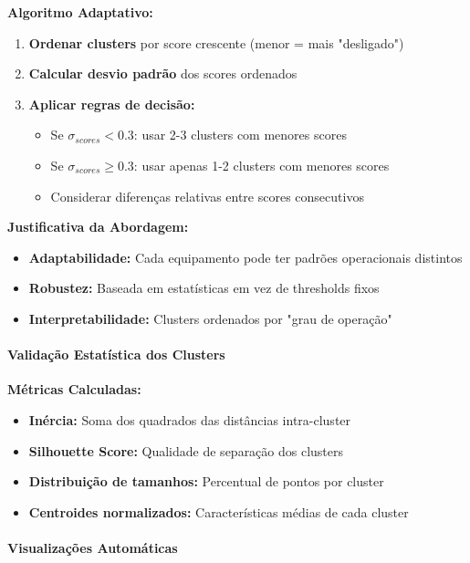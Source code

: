 \textbf{Algoritmo Adaptativo:}

\begin{enumerate}
    \item \textbf{Ordenar clusters} por score crescente (menor = mais "desligado")
    \item \textbf{Calcular desvio padrão} dos scores ordenados
    \item \textbf{Aplicar regras de decisão:}
    \begin{itemize}
        \item Se $\sigma_{scores} < 0.3$: usar 2-3 clusters com menores scores
        \item Se $\sigma_{scores} \geq 0.3$: usar apenas 1-2 clusters com menores scores
        \item Considerar diferenças relativas entre scores consecutivos
    \end{itemize}
\end{enumerate}

\textbf{Justificativa da Abordagem:}
\begin{itemize}
    \item \textbf{Adaptabilidade:} Cada equipamento pode ter padrões operacionais distintos
    \item \textbf{Robustez:} Baseada em estatísticas em vez de thresholds fixos
    \item \textbf{Interpretabilidade:} Clusters ordenados por "grau de operação"
\end{itemize}

\paragraph{Validação Estatística dos Clusters}

\textbf{Métricas Calculadas:}
\begin{itemize}
    \item \textbf{Inércia:} Soma dos quadrados das distâncias intra-cluster
    \item \textbf{Silhouette Score:} Qualidade de separação dos clusters
    \item \textbf{Distribuição de tamanhos:} Percentual de pontos por cluster
    \item \textbf{Centroides normalizados:} Características médias de cada cluster
\end{itemize}

\paragraph{Visualizações Automáticas}

